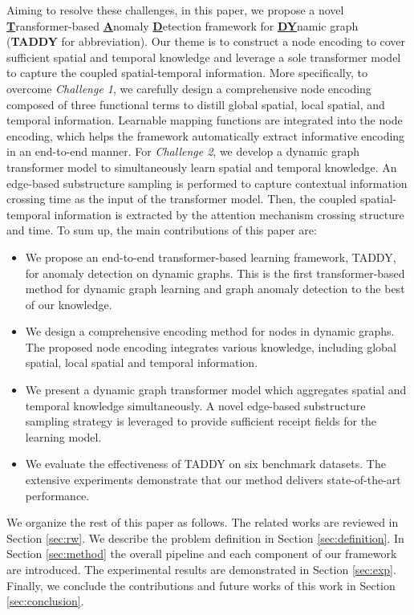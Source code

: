\documentclass[10pt,journal,compsoc]{IEEEtran}
\newcommand{\HL}{}
\newcommand{\yg}{}
\begin{document}
Aiming to resolve these challenges, in this paper, we propose a novel \underline{\textbf{T}}ransformer-based \underline{\textbf{A}}nomaly \underline{\textbf{D}}etection framework for \underline{\textbf{DY}}namic graph (\textbf{TADDY} for abbreviation). Our theme is to construct a node encoding to cover sufficient spatial and temporal knowledge and leverage a sole transformer model to capture \HL{the} coupled spatial-temporal information. 
More specifically, to overcome \textit{Challenge 1}, we carefully design a comprehensive node encoding composed of three functional terms \yg{to distill} global spatial, local spatial, and temporal information. Learnable mapping functions are integrated into the node encoding, which helps the framework automatically extract informative encoding in an end-to-end manner. For \textit{Challenge 2}, we develop a dynamic graph transformer model to simultaneously learn spatial and temporal knowledge. An edge-based substructure sampling is performed to capture contextual information crossing time as the input of the transformer model. Then, the coupled spatial-temporal information is extracted by the attention mechanism crossing structure and time. To sum up, the main contributions of this paper are:

\begin{itemize} 
	\item We propose an end-to-end transformer-based learning framework, TADDY, for anomaly detection on dynamic graphs. This is the first transformer-based method for dynamic graph learning and graph anomaly detection to the best of our knowledge.
	
	\item We design a comprehensive encoding method for nodes in dynamic graphs. The proposed node encoding integrates various knowledge, including global spatial, local spatial and temporal information.
	
	\item We present a dynamic graph transformer model which aggregates spatial and temporal knowledge simultaneously. A novel edge-based substructure sampling strategy is leveraged to provide sufficient receipt fields for the learning model.
	
	\item We evaluate the effectiveness of TADDY on \HL{six} benchmark datasets. The extensive experiments demonstrate that our method \yg{delivers state-of-the-art performance}.
\end{itemize}

We organize the rest of this paper as follows. The related works are reviewed in Section \ref{sec:rw}. We describe the problem definition in Section \ref{sec:definition}. In Section \ref{sec:method} the overall pipeline and each component of our framework are introduced. The experimental results are demonstrated in Section \ref{sec:exp}. Finally, we conclude the contributions and future works of this work in Section \ref{sec:conclusion}.
\end{document}
